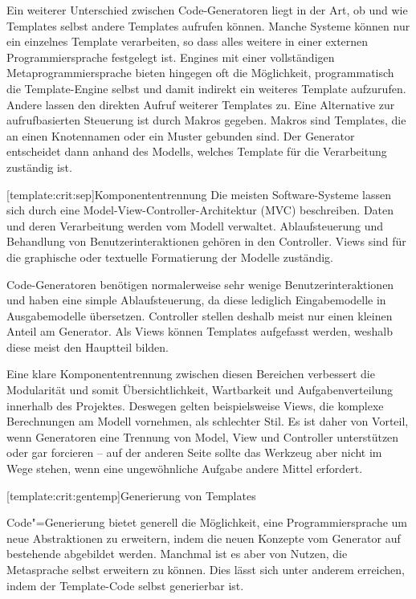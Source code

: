 \documentclass[12pt, a4paper, bibgerm]{scrbook}
\newcommand\lsubsection{}
\newcommand{\cgen}{Code"=Generierung}
\begin{document}
Ein weiterer Unterschied zwischen Code-Generatoren liegt in der Art, ob
und wie Templates selbst andere Templates aufrufen können. Manche
Systeme können nur ein einzelnes Template verarbeiten, so dass alles
weitere in einer externen Programmiersprache festgelegt ist. Engines mit
einer vollständigen Metaprogrammiersprache bieten hingegen oft die
Möglichkeit, programmatisch die Template-Engine selbst und damit
indirekt ein weiteres Template aufzurufen. Andere lassen den direkten
Aufruf weiterer Templates zu. Eine Alternative zur aufrufbasierten
Steuerung ist durch Makros gegeben. Makros sind Templates, die an einen
Knotennamen oder ein Muster gebunden sind. Der Generator entscheidet
dann anhand des Modells, welches Template für die Verarbeitung zuständig
ist.

\lsubsection[template:crit:sep]{Komponententrennung}
Die meisten Software-Systeme lassen sich durch eine
Model-View-Controller-Architektur (MVC) \cite[S.5ff]{DesignPatterns} beschreiben. Daten und deren
Verarbeitung werden vom Modell verwaltet. Ablaufsteuerung und Behandlung
von Benutzerinteraktionen gehören in den Controller. Views sind für die
graphische oder textuelle Formatierung der Modelle zuständig.

Code-Generatoren benötigen normalerweise sehr wenige
Benutzerinteraktionen und haben eine simple Ablaufsteuerung, da diese
lediglich Eingabemodelle in Ausgabemodelle übersetzen. Controller
stellen deshalb meist nur einen kleinen Anteil am Generator. Als Views
können Templates aufgefasst werden, weshalb diese meist den Hauptteil
bilden.

Eine klare Komponententrennung zwischen diesen Bereichen verbessert die
Modularität und somit Übersichtlichkeit, Wartbarkeit und
Aufgabenverteilung innerhalb des Projektes. Deswegen gelten
beispielsweise Views, die komplexe Berechnungen am Modell vornehmen, als
schlechter Stil. Es ist daher von Vorteil, wenn Generatoren eine
Trennung von Model, View und Controller unterstützen oder gar forcieren
-- auf der anderen Seite sollte das Werkzeug aber nicht im Wege stehen, wenn
eine ungewöhnliche Aufgabe andere Mittel erfordert.

\lsubsection[template:crit:gentemp]{Generierung von Templates}

\cgen{} bietet generell die Möglichkeit, eine Programmiersprache um neue
Abstraktionen zu erweitern, indem die neuen Konzepte vom Generator auf
bestehende abgebildet werden. Manchmal ist es aber von Nutzen, die
Metasprache selbst erweitern zu können. Dies lässt sich unter anderem
erreichen, indem der Template-Code selbst generierbar ist.
\end{document}
